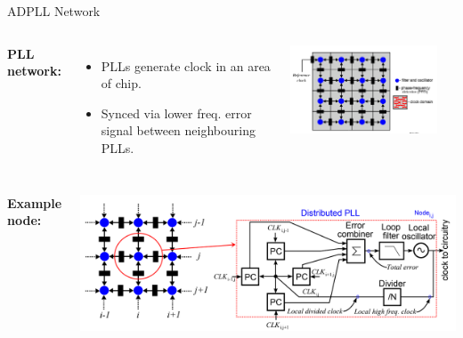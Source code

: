 \documentclass{beamer}
\begin{document}
\begin{frame}{ADPLL Network}
        
        \begin{columns}        	
        	\textbf{PLL network:}
	        \begin{itemize}
			    \item[]
			       	PLLs generate clock in an area of chip.
			    \item[]
			        Synced via lower freq. error signal between neighbouring PLLs.
    		\end{itemize}
        	\includegraphics[scale=0.55]{network_ccic2013}
        \begin{flushright}[Zianbetov, 2013]\end{flushright}
        \end{columns}
        \begin{columns}
            \column{\linewidth}
            \vspace{0.1 cm}
    	    \textbf{Example node:}
    	    \begin{center}
		    \includegraphics[scale=0.3]{eldar_node}
		    \end{center}
        \end{columns}
\end{frame}
\end{document}
